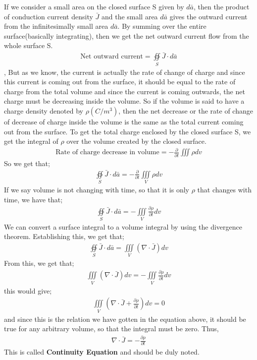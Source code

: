 If we consider a small area on the closed surface S given by $d\bar{a}$, then the product of conduction current density $\bar{J}$ and the small area $d\bar{a}$ gives the outward current from the infinitesimally small area $d\bar{a}$. By summing over the entire surface(basically integrating), then we get the net outward current flow from the whole surface S.
\begin{align*}
	\text{Net outward current}= \oiint\limits_S\bar{J}\cdot d\bar{a}
\end{align*},
But as we know, the current is actually the rate of change of charge and since this current is coming out from the surface, it should be equal to the rate of charge from the total volume and since the current is coming outwards, the net charge must be decreasing inside the volume. So if the volume is said to have a charge density denoted by $\rho (C/m^{3})$, then the net decrease or the rate of change of decrease of charge inside the volume is the same as the total current coming out from the surface. To get the total charge enclosed by the closed surface S, we get the integral of $\rho$ over the volume created by the closed surface.
\begin{align*}
	\text{Rate of charge decrease in volume}	= -\frac{\partial}{\partial t}\iiint \rho dv
\end{align*}
So we get that;
\begin{align*}
	\oiint\limits_S\bar{J}\cdot d\bar{a} = -\frac{\partial}{\partial t}\iiint\limits_V\rho dv
\end{align*}
If we say volume is not changing with time, so that it is only $\rho$ that changes with time, we have that;
\begin{align*}
	\oiint\limits_S\bar{J}\cdot d\bar{a} = -\iiint\limits_V\frac{\partial\rho}{\partial t}dv
\end{align*}
We can convert a surface integral to a volume integral by using the divergence theorem. Establishing this, we get that;
\begin{align*}
	\oiint\limits_S\bar{J}\cdot d\bar{a} = \iiint\limits_V(\nabla\cdot\bar{J})dv
\end{align*}
From this, we get that;
\begin{align*}
	\iiint\limits_V(\nabla\cdot\bar{J})dv = -\iiint\limits_V\frac{\partial\rho}{\partial t}dv
\end{align*}
this would give;
\begin{align*}
	\iiint\limits_V(\nabla\cdot\bar{J} + \frac{\partial\rho}{\partial t} )dv = 0
\end{align*}
and since this is the relation we have gotten in the equation above, it should be true for any arbitrary volume, so that the integral must be zero. Thus,
\begin{align}
	\nabla\cdot\bar{J} = -\frac{\partial\rho}{\partial t}
\end{align}
This is called \textbf{Continuity Equation} and should be duly noted.

